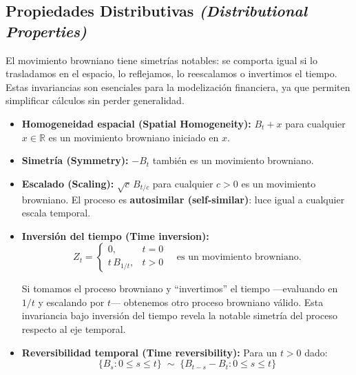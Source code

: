 \documentclass[12pt]{article}
\begin{document}
\subsection{Propiedades Distributivas \textit{(Distributional Properties)}}

\begin{intuicion}
El movimiento browniano tiene simetr\'ias notables: se comporta igual si lo trasladamos en el espacio, lo reflejamos, lo reescalamos o invertimos el tiempo. Estas invariancias son esenciales para la modelizaci\'on financiera, ya que permiten simplificar c\'alculos sin perder generalidad.
\end{intuicion}

\begin{itemize}
  \item \textbf{Homogeneidad espacial (Spatial Homogeneity):} $B_t + x$ para cualquier $x \in \mathbb{R}$ es un movimiento browniano iniciado en $x$.

  \item \textbf{Simetr\'ia (Symmetry):} $-B_t$ tambi\'en es un movimiento browniano.

  \item \textbf{Escalado (Scaling):} $\sqrt{c}\, B_{t/c}$ para cualquier $c > 0$ es un movimiento browniano. El proceso es \textbf{autosimilar (self-similar)}: luce igual a cualquier escala temporal.

  \item \textbf{Inversi\'on del tiempo (Time inversion):}
  \begin{equation}
    Z_t = \begin{cases} 0, & t = 0 \\ t\,B_{1/t}, & t > 0 \end{cases}
    \quad \text{es un movimiento browniano.}
  \end{equation}

  \begin{intuicionmat}
  Si tomamos el proceso browniano y ``invertimos'' el tiempo ---evaluando en $1/t$ y escalando por $t$--- obtenemos otro proceso browniano v\'alido. Esta invariancia bajo inversi\'on del tiempo revela la notable simetr\'ia del proceso respecto al eje temporal.
  \end{intuicionmat}

  \item \textbf{Reversibilidad temporal (Time reversibility):} Para un $t > 0$ dado:
  \[
    \{B_s : 0 \leq s \leq t\} \;\sim\; \{B_{t-s} - B_t : 0 \leq s \leq t\}
  \]
\end{itemize}
\end{document}
